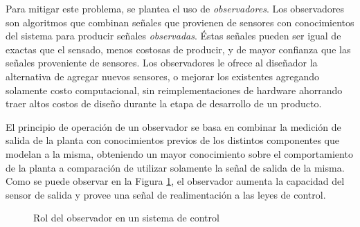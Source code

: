 \documentclass[10pt,a4paper]{article}
\begin{document}
\noindent Para mitigar este problema, se plantea el uso de \emph{observadores}. 
Los observadores son algoritmos que combinan señales que provienen de sensores 
con conocimientos del sistema para producir señales \emph{observadas}. 
\'Estas señales pueden ser igual de exactas que el sensado, menos costosas de 
producir, y de mayor confianza que las señales proveniente de sensores. 
Los observadores le ofrece al diseñador la alternativa de agregar nuevos 
sensores, o mejorar los existentes agregando solamente costo computacional, sin 
reimplementaciones de hardware ahorrando traer altos costos de diseño durante la
etapa de desarrollo de un producto.

\noindent El principio de operaci\'on de un observador se basa en combinar la
medici\'on de salida de la planta con conocimientos previos de los distintos 
componentes que modelan a la misma, obteniendo un mayor conocimiento sobre el 
comportamiento de la planta a comparaci\'on de utilizar solamente la señal de 
salida de la misma. Como se puede observar en la Figura \ref{role_observer}, el 
observador aumenta la capacidad del sensor de salida y provee una señal de 
realimentaci\'on a las leyes de control.

\begin{figure}[h!]
    \begin{center}
    \caption{Rol del observador en un sistema de control}
    \label{role_observer}
    \end{center}
\end{figure}
\end{document}
